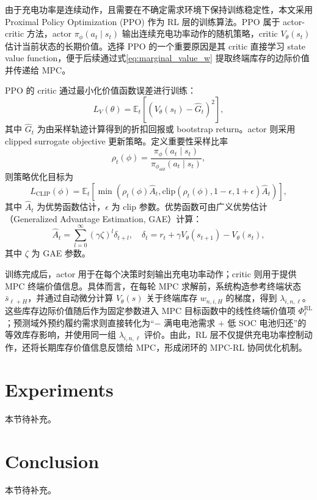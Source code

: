 \documentclass[12pt,hyperref,a4paper,UTF8]{ctexart}
\begin{document}
由于充电功率是连续动作，且需要在不确定需求环境下保持训练稳定性，本文采用 Proximal Policy Optimization (PPO) 作为 RL 层的训练算法。PPO 属于 actor-critic 方法，actor $\pi_{\phi}(a_t\mid s_t)$ 输出连续充电功率动作的随机策略，critic $V_{\theta}(s_t)$ 估计当前状态的长期价值。选择 PPO 的一个重要原因是其 critic 直接学习 state value function，便于后续通过式\eqref{eq:marginal_value_w} 提取终端库存的边际价值并传递给 MPC。

PPO 的 critic 通过最小化价值函数误差进行训练：
\begin{equation}
L_V(\theta)=
\mathbb{E}_t\left[
\left(V_{\theta}(s_t)-\hat{G}_t\right)^2
\right],
\label{eq:value_loss}
\end{equation}
其中 $\hat{G}_t$ 为由采样轨迹计算得到的折扣回报或 bootstrap return。actor 则采用 clipped surrogate objective 更新策略。定义重要性采样比率
\begin{equation}
\rho_t(\phi)=
\frac{\pi_{\phi}(a_t\mid s_t)}{\pi_{\phi_{old}}(a_t\mid s_t)},
\label{eq:ppo_ratio}
\end{equation}
则策略优化目标为
\begin{equation}
L_{\mathrm{CLIP}}(\phi)=
\mathbb{E}_t\left[
\min\left(
\rho_t(\phi)\hat{A}_t,
\mathrm{clip}(\rho_t(\phi),1-\epsilon,1+\epsilon)\hat{A}_t
\right)
\right],
\label{eq:ppo_clip}
\end{equation}
其中 $\hat{A}_t$ 为优势函数估计，$\epsilon$ 为 clip 参数。优势函数可由广义优势估计（Generalized Advantage Estimation, GAE）计算：
\begin{equation}
\hat{A}_t=\sum_{l=0}^{\infty}(\gamma\zeta)^l\delta_{t+l},
\quad
\delta_t=r_t+\gamma V_{\theta}(s_{t+1})-V_{\theta}(s_t),
\label{eq:gae}
\end{equation}
其中 $\zeta$ 为 GAE 参数。

训练完成后，actor 用于在每个决策时刻输出充电功率动作；critic 则用于提供 MPC 终端价值信息。具体而言，在每轮 MPC 求解前，系统构造参考终端状态 $\bar{s}_{\ell+H}$，并通过自动微分计算 $V_{\theta}(s)$ 关于终端库存 $w_{n,i,H}$ 的梯度，得到 $\lambda_{i,n,\ell}$。这些库存边际价值随后作为固定参数进入 MPC 目标函数中的线性终端价值项 $\Phi_{\ell}^{\mathrm{RL}}$；预测域外预约履约需求则直接转化为“$-$ 满电电池需求 $+$ 低 SOC 电池归还”的等效库存影响，并使用同一组 $\lambda_{i,n,\ell}$ 评价。由此，RL 层不仅提供充电功率控制动作，还将长期库存价值信息反馈给 MPC，形成闭环的 MPC-RL 协同优化机制。

\section{Experiments}

本节待补充。

\section{Conclusion}

本节待补充。


\end{document}
